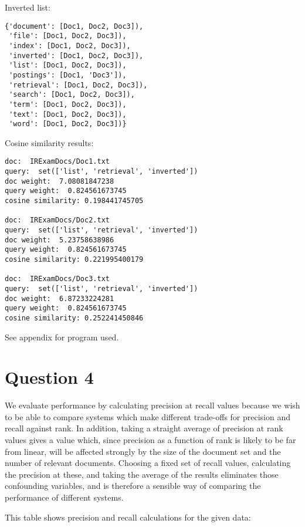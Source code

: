 \documentclass[11pt]{article}
\begin{document}
Inverted list:
\begin{verbatim}
{'document': [Doc1, Doc2, Doc3]),
 'file': [Doc1, Doc2, Doc3]),
 'index': [Doc1, Doc2, Doc3]),
 'inverted': [Doc1, Doc2, Doc3]),
 'list': [Doc1, Doc2, Doc3]),
 'postings': [Doc1, 'Doc3']),
 'retrieval': [Doc1, Doc2, Doc3]),
 'search': [Doc1, Doc2, Doc3]),
 'term': [Doc1, Doc2, Doc3]),
 'text': [Doc1, Doc2, Doc3]),
 'word': [Doc1, Doc2, Doc3])}
\end{verbatim}

Cosine similarity results:
\begin{verbatim}
doc:  IRExamDocs/Doc1.txt
query:  set(['list', 'retrieval', 'inverted'])
doc weight:  7.08081847238
query weight:  0.824561673745
cosine similarity: 0.198441745705 

doc:  IRExamDocs/Doc2.txt
query:  set(['list', 'retrieval', 'inverted'])
doc weight:  5.23758638986
query weight:  0.824561673745
cosine similarity: 0.221995400179 

doc:  IRExamDocs/Doc3.txt
query:  set(['list', 'retrieval', 'inverted'])
doc weight:  6.87233224281
query weight:  0.824561673745
cosine similarity: 0.252241450846
\end{verbatim}

See appendix for program used.

\section*{Question 4}

We evaluate performance by calculating precision at recall values because we
wish to be able to compare systems which make different trade-offs for
precision and recall against rank. In addition, taking a straight average of
precision at rank values gives a value which, since precision as a function of
rank is likely to be far from linear, will be affected strongly by the size of
the document set and the number of relevant documents. Choosing a fixed set of
recall values, calculating the precision at these, and taking the average of
the results eliminates those confounding variables, and is therefore a sensible
way of comparing the performance of different systems.

This table shows precision and recall calculations for the given data:
\end{document}
